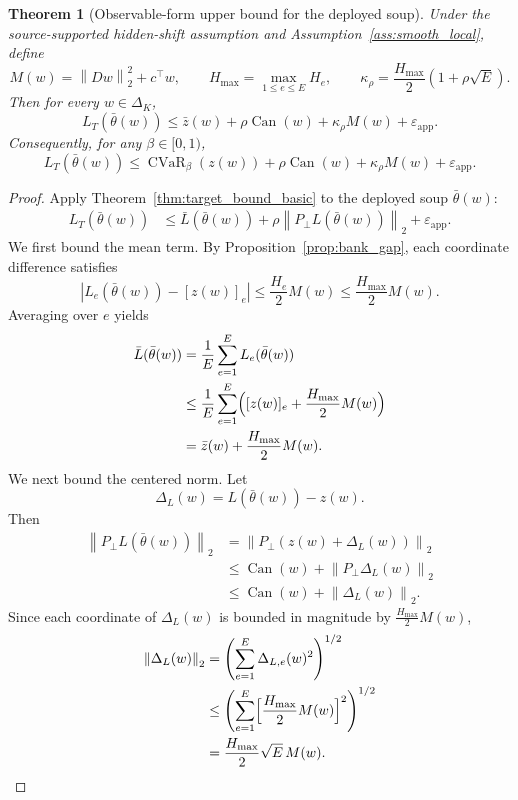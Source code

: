 \documentclass[11pt]{article}
\newcommand{\1}{\mathbf{1}}
\newcommand{\cvar}{\operatorname{CVaR}}
\newcommand{\norm}[1]{\left\lVert #1 \right\rVert}
\newcommand{\abs}[1]{\left\lvert #1 \right\rvert}
\newcommand{\Dset}{\Delta_K}
\newcommand{\Pperp}{P_\perp}
\theoremstyle{plain}
\newtheorem{theorem}{Theorem}[section]
\theoremstyle{definition}
\theoremstyle{remark}
\begin{document}
\begin{theorem}[Observable-form upper bound for the deployed soup]\label{thm:observable_upper}
Under the source-supported hidden-shift assumption and Assumption~\ref{ass:smooth_local}, define
\[
M(w) = \norm{Dw}_2^2 + c^\top w,
\qquad
H_{\max} = \max_{1\le e\le E} H_e,
\qquad
\kappa_{\rho} = \frac{H_{\max}}{2}(1 + \rho\sqrt{E}).
\]
Then for every $w \in \Dset$,
\[
L_T(\bar\theta(w))
\le \bar z(w) + \rho\operatorname{Can}(w) + \kappa_{\rho} M(w) + \varepsilon_{\mathrm{app}}.
\]
Consequently, for any $\beta \in [0,1)$,
\[
L_T(\bar\theta(w))
\le \cvar_{\beta}(z(w)) + \rho\operatorname{Can}(w) + \kappa_{\rho} M(w) + \varepsilon_{\mathrm{app}}.
\]
\end{theorem}

\begin{proof}
Apply Theorem~\ref{thm:target_bound_basic} to the deployed soup $\bar\theta(w)$:
\begin{align*}
L_T(\bar\theta(w))
&\le \bar L(\bar\theta(w)) + \rho\norm{\Pperp L(\bar\theta(w))}_2 + \varepsilon_{\mathrm{app}}.
\end{align*}
We first bound the mean term. By Proposition~\ref{prop:bank_gap}, each coordinate difference satisfies
\[
\abs{L_e(\bar\theta(w)) - [z(w)]_e} \le \frac{H_e}{2} M(w) \le \frac{H_{\max}}{2}M(w).
\]
Averaging over $e$ yields
\begin{align*}
\bar L(\bar\theta(w))
&= \frac{1}{E}\sum_{e=1}^E L_e(\bar\theta(w)) \\
&\le \frac{1}{E}\sum_{e=1}^E \Bigl([z(w)]_e + \frac{H_{\max}}{2}M(w)\Bigr) \\
&= \bar z(w) + \frac{H_{\max}}{2}M(w).
\end{align*}
We next bound the centered norm. Let
\[
\Delta_L(w) = L(\bar\theta(w)) - z(w).
\]
Then
\begin{align*}
\norm{\Pperp L(\bar\theta(w))}_2
&= \norm{\Pperp(z(w) + \Delta_L(w))}_2 \\
&\le \operatorname{Can}(w) + \norm{\Pperp \Delta_L(w)}_2 \\
&\le \operatorname{Can}(w) + \norm{\Delta_L(w)}_2.
\end{align*}
Since each coordinate of $\Delta_L(w)$ is bounded in magnitude by $\frac{H_{\max}}{2}M(w)$,
\begin{align*}
\norm{\Delta_L(w)}_2
&= \Biggl(\sum_{e=1}^E \Delta_{L,e}(w)^2\Biggr)^{1/2} \\
&\le \Biggl(\sum_{e=1}^E \Bigl[\frac{H_{\max}}{2}M(w)\Bigr]^2\Biggr)^{1/2} \\
&= \frac{H_{\max}}{2}\sqrt{E}\,M(w).

\end{align*}
\end{proof}
\end{document}
